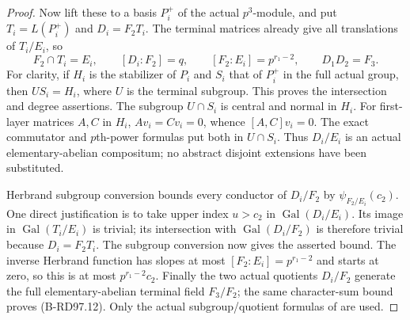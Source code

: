 \begin{proof}
Now lift these to a basis $P_i^+$ of the actual $p^3$-module,
and put $T_i=L(P_i^+)$ and $D_i=F_2T_i$. The terminal matrices
already give all translations of $T_i/E_i$, so
\[
 F_2\cap T_i=E_i,\qquad [D_i:F_2]=q,
 \qquad[F_2:E_i]=p^{r_1-2},\qquad D_1D_2=F_3.
                                                        \tag{B-RD97.14}
\]
For clarity, if $H_i$ is the stabilizer of $P_i$ and $S_i$
that of $P_i^+$ in the full actual group, then $US_i=H_i$,
where $U$ is the terminal subgroup. This proves the intersection
and degree assertions. The subgroup $U\cap S_i$ is central
and normal in $H_i$. For first-layer matrices $A,C$ in $H_i$,
$Av_i=Cv_i=0$, whence $[A,C]v_i=0$. The exact commutator and
$p$th-power formulas put both in $U\cap S_i$. Thus $D_i/E_i$
is an actual elementary-abelian compositum; no abstract disjoint
extensions have been substituted.

Herbrand subgroup conversion bounds every conductor of
$D_i/F_2$ by $\psi_{F_2/E_i}(c_2)$. One direct justification
is to take upper index $u>c_2$ in $\operatorname{Gal}(D_i/E_i)$.
Its image in $\operatorname{Gal}(T_i/E_i)$ is trivial; its
intersection with $\operatorname{Gal}(D_i/F_2)$ is therefore
trivial because $D_i=F_2T_i$. The subgroup conversion now gives
the asserted bound. The inverse Herbrand function has slopes
at most $[F_2:E_i]=p^{r_1-2}$ and starts at zero, so this is
at most $p^{r_1-2}c_2$. Finally the two actual quotients
$D_i/F_2$ generate the full elementary-abelian terminal field
$F_3/F_2$; the same character-sum bound proves (B-RD97.12).
Only the actual subgroup/quotient formulas of
\cite[Proposition3.7, Theorem3.10 and Proposition3.13,
complete proofs, pp.~14--16]{ColmezCorpsLocaux} are used.
\end{proof}

